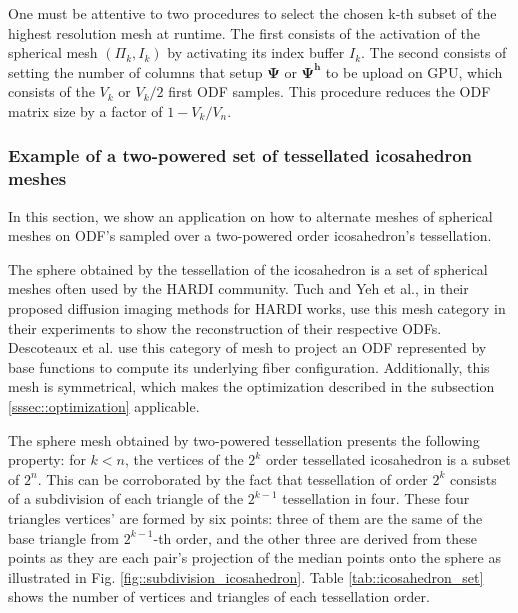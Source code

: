 \documentclass[twoside,twocolumn,10pt]{article}
\begin{document}

One must be attentive to two procedures to select the chosen k-th subset of the highest resolution mesh at runtime. The first consists of the activation of the spherical mesh $(\Pi_k, I_k)$ by activating its index buffer $I_k$. The second consists of setting the number of columns that setup $\bm{\Psi}$ or $\bm{\Psi^h}$ to be upload on GPU, which consists of the $V_k$ or $V_k/2$ first ODF samples. This procedure reduces the ODF matrix size by a factor of $1-V_k/V_n$.

\subsubsection{Example of a two-powered set of tessellated icosahedron meshes}
\label{sssec::ico_example}

In this section, we show an application on how to alternate meshes of spherical meshes on ODF's sampled over a two-powered order icosahedron's tessellation.

The sphere obtained by the tessellation of the icosahedron is a set of spherical meshes often used by the HARDI community. Tuch \cite{TuchQBall2004} and Yeh et al., \cite{yeh2010} in their proposed diffusion imaging methods for HARDI works, use this mesh category in their experiments to show the reconstruction of their respective ODFs. Descoteaux et al. \cite{descoteaux2007} use this category of mesh to project an ODF represented by base functions to compute its underlying fiber configuration. Additionally, this mesh is symmetrical, which makes the optimization described in the subsection \ref{sssec::optimization} applicable.

The sphere mesh obtained by two-powered tessellation presents the following property:  for $k < n$, the vertices of the $2^{k}$ order tessellated icosahedron is a subset of $2^{n}$. This can be corroborated by the fact that tessellation of order $2^k$ consists of a subdivision of each triangle of the $2^{k-1}$ tessellation in four. These four triangles vertices' are formed by six points: three of them are the same of the base triangle from $2^{k-1}$-th order, and the other three are derived from these points as they are each pair's projection of the median points onto the sphere as illustrated in Fig. \ref{fig::subdivision_icosahedron}. Table \ref{tab::icosahedron_set} shows the number of vertices and triangles of each tessellation order.
\end{document}
